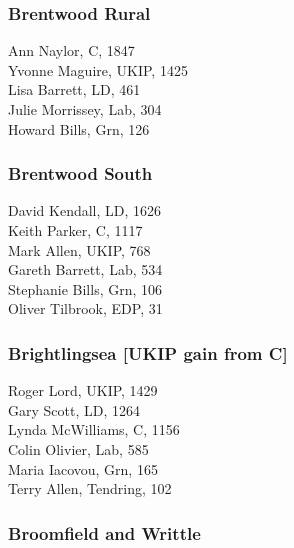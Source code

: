 \documentclass[a4paper,openany,10pt]{book}
\begin{document}
\subsubsection*{Brentwood Rural}



Ann Naylor, C, 1847\\
Yvonne Maguire, UKIP, 1425\\
Lisa Barrett, LD, 461\\
Julie Morrissey, Lab, 304\\
Howard Bills, Grn, 126\\


\subsubsection*{Brentwood South}



David Kendall, LD, 1626\\
Keith Parker, C, 1117\\
Mark Allen, UKIP, 768\\
Gareth Barrett, Lab, 534\\
Stephanie Bills, Grn, 106\\
Oliver Tilbrook, EDP, 31\\


\subsubsection*{Brightlingsea \hspace*{\fill}\nolinebreak[1]%
\enspace\hspace*{\fill}
[UKIP gain from C]}



Roger Lord, UKIP, 1429\\
Gary Scott, LD, 1264\\
Lynda McWilliams, C, 1156\\
Colin Olivier, Lab, 585\\
Maria Iacovou, Grn, 165\\
Terry Allen, Tendring, 102\\


\subsubsection*{Broomfield and Writtle}
\end{document}
